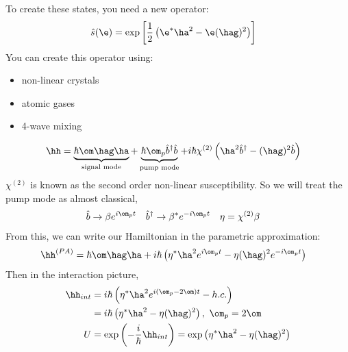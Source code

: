 \documentclass[a4paper, 11pt, normalem]{report}
\begin{document}
To create these states, you need a new operator:
\begin{align}
    \hat{s}(\e) &= \exp\left[\frac12\left(\e^*\ha^2 - \e(\hag)^2\right)\right]
\end{align}
You can create this operator using:
\begin{itemize}
    \item non-linear crystals
    \item atomic gases
    \item 4-wave mixing
\end{itemize}
\begin{align}
    \hh &= \underbrace{\hbar\om\hag\ha}_{\text{signal mode}} + \underbrace{\hbar\om_p\hat{b}^\dagger\hat{b}}_{\text{pump mode}} + i\hbar\chi^{(2)}\left(\ha^2\hat{b}^\dagger - (\hag)^2\hat{b}\right)
\end{align}
$\chi^{(2)}$ is known as the second order non-linear susceptibility.
So we will treat the pump mode as almost classical,
\begin{align}
    \hat{b} &\to \beta e^{i\om_p t} & \hat{b}^\dagger &\to \beta^*e^{-i\om_p t} & \eta &= \chi^{(2)}\beta
\end{align}
From this, we can write our Hamiltonian in the parametric approximation:
\begin{align}
    \hh^{(PA)} &= \hbar\om\hag\ha + i\hbar\left(\eta^*\ha^2e^{i\om_p t} - \eta(\hag)^2e^{-i\om_p t}\right)
\end{align}
Then in the interaction picture,
\begin{align}
    \hh_{int} &= i\hbar\left(\eta^*\ha^2e^{i(\om_p - 2\om)t} - h.c.\right) \\
              &= i\hbar\left(\eta^*\ha^2 - \eta(\hag)^2\right),~ \om_p = 2\om \\
    U &= \exp\left(-\frac{i}{\hbar}\hh_{int}\right) = \exp\left(\eta^*\ha^2 - \eta(\hag)^2 \right)
\end{align}

\chapter{}
\end{document}
